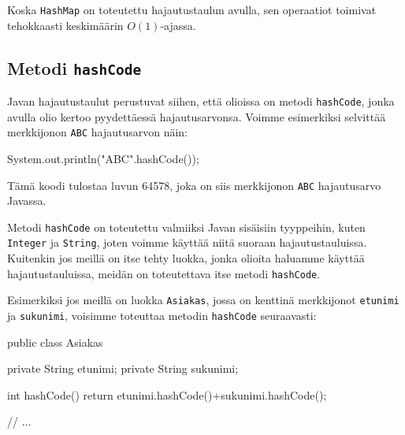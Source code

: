 Koska \texttt{HashMap} on toteutettu hajautustaulun avulla,
sen operaatiot toimivat tehokkaasti keskimäärin $O(1)$-ajassa.

\subsection{Metodi \texttt{hashCode}}

Javan hajautustaulut perustuvat siihen, että olioissa
on metodi \texttt{hashCode}, jonka avulla olio kertoo
pyydettäessä hajautusarvonsa.
Voimme esimerkiksi selvittää merkkijonon \texttt{ABC}
hajautusarvon näin:

\begin{code}
System.out.println("ABC".hashCode());
\end{code}

Tämä koodi tulostaa luvun 64578,
joka on siis merkkijonon \texttt{ABC} hajautusarvo Javassa.

Metodi \texttt{hashCode} on toteutettu valmiiksi Javan
sisäisiin tyyppeihin, kuten \texttt{Integer} ja \texttt{String},
joten voimme käyttää niitä suoraan hajautustauluissa.
Kuitenkin jos meillä on itse tehty luokka, jonka olioita
haluamme käyttää hajautustauluissa, meidän on toteutettava
itse metodi \texttt{hashCode}.

Esimerkiksi jos meillä on luokka \texttt{Asiakas},
jossa on kenttinä merkkijonot
\texttt{etunimi} ja \texttt{sukunimi},
voisimme toteuttaa metodin \texttt{hashCode} seuraavasti:

\begin{code}
public class Asiakas {
    private String etunimi;
    private String sukunimi;

    int hashCode() {
        return etunimi.hashCode()+sukunimi.hashCode();
    }

    // ...
}
\end{code}

